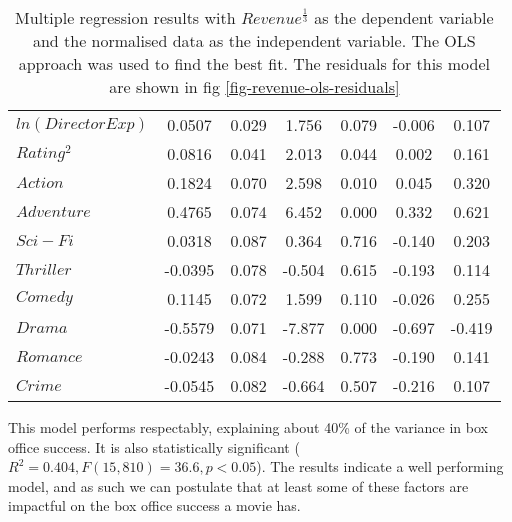 \begin{table}[H]
\begin{center}
\begin{tabular}{lcccccc}
                    \textbf{$ln(Director Exp)$}     &       0.0507  &        0.029     &     1.756  &         0.079        &       -0.006    &        0.107     \\
                    \textbf{$Rating^2$}             &       0.0816  &        0.041     &     2.013  &         0.044        &        0.002    &        0.161     \\
                    \textbf{$Action$}               &       0.1824  &        0.070     &     2.598  &         0.010        &        0.045    &        0.320     \\
                    \textbf{$Adventure$}            &       0.4765  &        0.074     &     6.452  &         0.000        &        0.332    &        0.621     \\
                    \textbf{$Sci-Fi$}               &       0.0318  &        0.087     &     0.364  &         0.716        &       -0.140    &        0.203     \\
                    \textbf{$Thriller$}             &      -0.0395  &        0.078     &    -0.504  &         0.615        &       -0.193    &        0.114     \\
                    \textbf{$Comedy$}               &       0.1145  &        0.072     &     1.599  &         0.110        &       -0.026    &        0.255     \\
                    \textbf{$Drama$}                &      -0.5579  &        0.071     &    -7.877  &         0.000        &       -0.697    &       -0.419     \\
                    \textbf{$Romance$}              &      -0.0243  &        0.084     &    -0.288  &         0.773        &       -0.190    &        0.141     \\
                    \textbf{$Crime$}                &      -0.0545  &        0.082     &    -0.664  &         0.507        &       -0.216    &        0.107     \\
                    \bottomrule
                \end{tabular}
            \end{center}
            \caption[short]{Multiple regression results with $Revenue^{\frac{1}{3}}$ as the dependent variable
                            and the normalised data as the independent variable. The OLS approach was used to
                            find the best fit. The residuals for this model are shown in 
                            fig \ref{fig-revenue-ols-residuals}}\label{tab-revenue-ols-summary}
        \end{table}
        This model performs respectably, explaining about  40\% of the variance in box office success.
        It is also statistically significant ($R^2=0.404, F(15,810)=36.6, p<0.05$).
        The results indicate a well performing model, and as such we can postulate 
            that at least some of these factors are impactful on the box office success a movie has.

